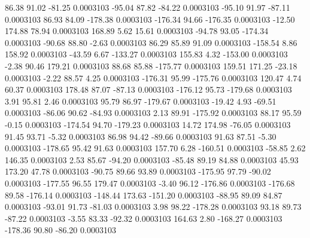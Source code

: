        86.38       91.02      -81.25     0.0003103
      -95.04       87.82      -84.22     0.0003103
      -95.10       91.97      -87.11     0.0003103
       86.93       84.09     -178.38     0.0003103
     -176.34       94.66     -176.35     0.0003103
      -12.50      174.88       78.94     0.0003103
      168.89        5.62       15.61     0.0003103
      -94.78       93.05     -174.34     0.0003103
      -90.68       88.80       -2.63     0.0003103
       86.29       85.89       91.09     0.0003103
     -158.54        8.86      158.92     0.0003103
      -43.59        6.67     -133.27     0.0003103
      155.83        4.32     -153.00     0.0003103
       -2.38       90.46      179.21     0.0003103
       88.68       85.88     -175.77     0.0003103
      159.51      171.25      -23.18     0.0003103
       -2.22       88.57        4.25     0.0003103
     -176.31       95.99     -175.76     0.0003103
      120.47        4.74       60.37     0.0003103
      178.48       87.07      -87.13     0.0003103
     -176.12       95.73     -179.68     0.0003103
        3.91       95.81        2.46     0.0003103
       95.79       86.97     -179.67     0.0003103
      -19.42        4.93      -69.51     0.0003103
      -86.06       90.62      -84.93     0.0003103
        2.13       89.91     -175.92     0.0003103
       88.17       95.59       -0.15     0.0003103
     -174.54       94.70     -179.23     0.0003103
       14.72      174.98      -76.05     0.0003103
       91.45       93.71       -5.32     0.0003103
       86.98       94.42      -89.66     0.0003103
       91.63       87.51       -5.30     0.0003103
     -178.65       95.42       91.63     0.0003103
      157.70        6.28     -160.51     0.0003103
      -58.85        2.62      146.35     0.0003103
        2.53       85.67      -94.20     0.0003103
      -85.48       89.19       84.88     0.0003103
       45.93      173.20       47.78     0.0003103
      -90.75       89.66       93.89     0.0003103
     -175.95       97.79      -90.02     0.0003103
     -177.55       96.55      179.47     0.0003103
       -3.40       96.12     -176.86     0.0003103
     -176.68       89.58     -176.14     0.0003103
     -148.44      173.63     -151.20     0.0003103
      -88.95       89.09       84.87     0.0003103
      -93.01       91.73      -81.03     0.0003103
        3.98       98.22     -178.28     0.0003103
       93.18       89.73      -87.22     0.0003103
       -3.55       83.33      -92.32     0.0003103
      164.63        2.80     -168.27     0.0003103
     -178.36       90.80      -86.20     0.0003103
